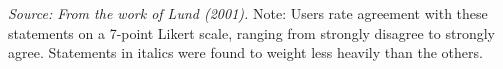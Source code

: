 \textit{Source: From the work of Lund (2001).}
Note: Users rate agreement with these statements on a 7-point Likert scale, ranging from strongly disagree to strongly agree. Statements in italics were found to weight less heavily than the others.





